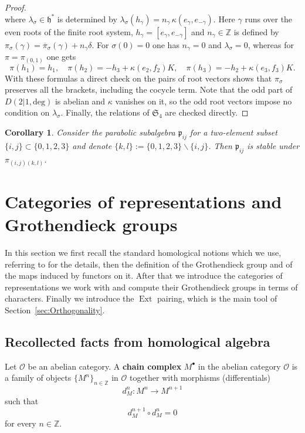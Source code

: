 \documentclass[10pt]{amsart}
\newcommand{\Daniil}[1]{\todo[inline,color=orange!60,author=Daniil]{#1}}
\newtheorem{corollary}[theorem]{Corollary}
\newcommand{\fp}{{\mathfrak p}}
\newcommand{\fh}{{\mathfrak h}}
\newcommand{\Ddeg}{D(2|1,\mathrm{deg})}
\DeclareMathOperator{\Ext}{Ext}
\begin{document}
\begin{proof}
\begin{equation*}
		\end{equation*}
		where $\lambda_\sigma \in \fh^*$ is determined by $\lambda_\sigma(h_{\gamma})=n_{\gamma}\,\kappa(e_\gamma,e_{-\gamma})$. Here $\gamma$ runs over the even roots of the finite root system, $h_\gamma=[e_\gamma,e_{-\gamma}]$ and $n_\gamma \in \mathbb{Z}$ is defined by $\pi_\sigma(\gamma)=\overline{\pi}_\sigma(\gamma)+n_\gamma\delta$. For $\sigma(0)=0$ one has $n_\gamma=0$ and $\lambda_\sigma=0$, whereas for $\pi=\pi_{(0,1)}$ one gets
		\[\pi(h_1)=h_1,\quad \pi(h_2)=-h_3+\kappa(e_2,f_2)K,\quad \pi(h_3)=-h_2+\kappa(e_3,f_3)K.\]
		With these formulas a direct check on the pairs of root vectors shows that $\pi_\sigma$ preserves all the brackets, including the cocycle term. Note that the odd part of $\Ddeg$ is abelian and $\kappa$ vanishes on it, so the odd root vectors impose no condition on $\lambda_\sigma$. Finally, the relations of $\mathfrak{S}_4$ are checked directly.
	\end{proof}
	
	\begin{corollary}\label{cor:ParabolicStable}
		Consider the parabolic subalgebra $\fp_{ij}$ for a two-element subset $\{i,j\}\subset \{0,1,2,3\}$ and denote $\{k,l\}:=\{0,1,2,3\} \backslash \{i,j\}$. Then $\fp_{ij}$ is stable under $\pi_{(i,j)(k,l)}$.
	\end{corollary}
	
	\section{Categories of representations and Grothendieck groups}\label{sec:Categories}
	In this section we first recall the standard homological notions which we use, referring to \cite{weibel1994introduction} for the details, then the definition of the Grothendieck group and of the maps induced by functors on it. After that we introduce the categories of representations we work with and compute their Grothendieck groups in terms of characters. Finally we introduce the $\Ext$ pairing, which is the main tool of Section~\ref{sec:Orthogonality}.
	
	\subsection{Recollected facts from homological algebra}
	Let $\mathcal{O}$ be an abelian category.
	A \textbf{chain complex} \( M^\bullet \) in the abelian category \( \mathcal{O} \) is a family of objects \( \{M^n\}_{n \in \mathbb{Z}} \) in \( \mathcal{O} \) together with morphisms (differentials)
	\[
	d_M^n: M^n \longrightarrow M^{n+1}
	\]
	such that
	\[
	d_M^{n+1} \circ d_M^n = 0
	\]
	for every \( n \in \mathbb{Z} \).
	
\end{document}
